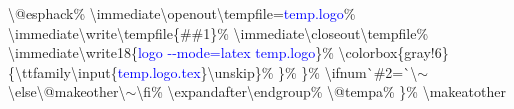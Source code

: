 \begin{linenumbers}
\hspace*{3.6em}\textbackslash @esphack\%\newline
\hspace*{3.6em}\textbackslash immediate\textbackslash openout\textbackslash tempf{}ile=\textcolor{blue}{temp.logo}\%\newline
\hspace*{3.6em}\textbackslash immediate\textbackslash write\textbackslash tempf{}ile\{\#\#1\}\%\newline
\hspace*{3.6em}\textbackslash immediate\textbackslash closeout\textbackslash tempf{}ile\%\newline
\hspace*{3.6em}\textbackslash immediate\textbackslash write18\{\textcolor{blue}{logo -{}-mode=latex temp.logo}\}\%\newline
\hspace*{3.6em}\textbackslash colorbox\{gray!6\}\{\textbackslash ttfamily\textbackslash input\{\textcolor{blue}{temp.logo.tex}\}\textbackslash unskip\}\%\newline
\hspace*{2.4em}\}\%\newline
\hspace*{1.2em}\}\%\newline
\hspace*{1.2em}\textbackslash ifnum\`{}\#2=\`{}\textbackslash $\sim$\textbackslash else\textbackslash @makeother\textbackslash $\sim$\textbackslash f{}i\%\newline
\hspace*{1.2em}\textbackslash expandafter\textbackslash endgroup\%\newline
\hspace*{1.2em}\textbackslash @tempa\%\newline
\}\%\newline
\textbackslash makeatother
\end{linenumbers}

